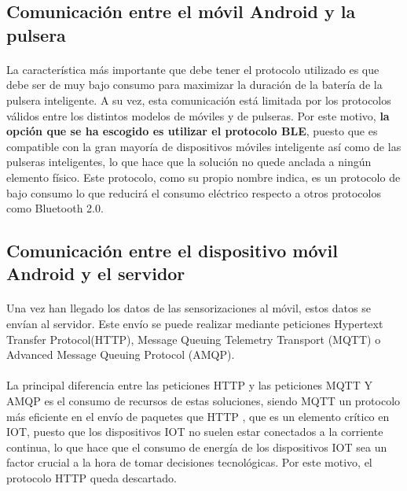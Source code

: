 \subsection{Comunicación entre el móvil Android y la pulsera}
\paragraph{}
La característica más importante que debe tener el protocolo utilizado es que debe ser de muy bajo consumo para maximizar la duración de la batería de la pulsera inteligente. A su vez, esta comunicación está limitada por los protocolos válidos entre los distintos modelos de móviles y de pulseras. Por este motivo, \textbf{la opción que se ha escogido es utilizar el protocolo BLE}, puesto que es compatible con la gran mayoría de dispositivos móviles inteligente así como de las pulseras inteligentes, lo que hace que la solución no quede anclada a ningún elemento físico. Este protocolo, como su propio nombre indica, es un protocolo de bajo consumo lo que reducirá el consumo eléctrico respecto a otros protocolos como Bluetooth 2.0.

\subsection{Comunicación entre el dispositivo móvil Android y el servidor}
\label{subsec:comAndroidServ}
\paragraph{}
Una vez han llegado los datos de las sensorizaciones al móvil, estos datos se envían al servidor. Este envío se puede realizar mediante peticiones Hypertext Transfer Protocol(HTTP), Message Queuing Telemetry Transport (MQTT) o Advanced Message Queuing Protocol (AMQP).

\paragraph{}
La principal diferencia entre las peticiones HTTP y las peticiones MQTT Y AMQP es el consumo de recursos de estas soluciones, siendo MQTT un protocolo más eficiente en el envío de paquetes que HTTP \citep{yokotani2016comparison}, que es un elemento crítico en IOT, puesto que los dispositivos IOT no suelen estar conectados a la corriente continua, lo que hace que el consumo de energía de los dispositivos IOT sea un factor crucial a la hora de tomar decisiones tecnológicas. Por este motivo, el protocolo HTTP queda descartado.

